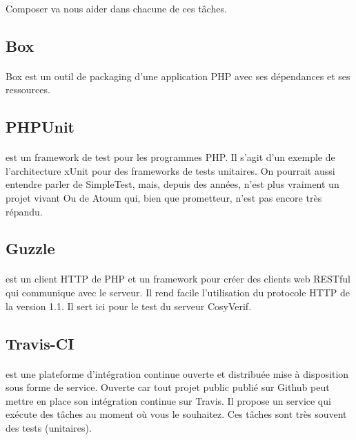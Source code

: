 \documentclass{report}
\begin{document}
\paragraph{}
Composer va nous aider dans chacune de ces tâches.

\subsection{Box}

\paragraph{}
Box est un outil de packaging d'une application PHP avec ses dépendances et ses ressources.

\subsection{PHPUnit}

\paragraph{}
est un framework de test pour les programmes PHP. Il s'agit d'un exemple de l'architecture xUnit pour des frameworks 
de tests unitaires. On pourrait aussi entendre parler de SimpleTest, mais, depuis des années, n’est plus vraiment un 
projet vivant Ou de Atoum qui, bien que prometteur, n’est pas encore très répandu.

\subsection{Guzzle}

\paragraph{}
est un client HTTP de PHP et un framework pour créer des clients web RESTful qui communique avec le serveur. 
Il rend facile l'utilisation du protocole HTTP de la version 1.1. Il sert ici pour le test du serveur CosyVerif.

\subsection{Travis-CI}

\paragraph{}
est une plateforme d’intégration continue ouverte et distribuée mise à disposition sous forme de service. Ouverte car 
tout projet public publié sur Github peut mettre en place son intégration continue sur Travis. Il propose un service qui 
exécute des tâches au moment où vous le souhaitez. Ces tâches sont très souvent des tests (unitaires).
\end{document}
